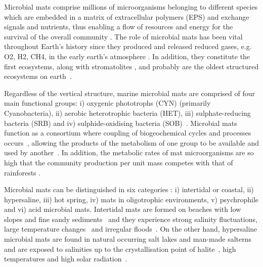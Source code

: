    Microbial mats comprise millions of microorganisms belonging to different species which are embedded in a matrix of 
   extracellular polymers (EPS) and exchange signals and nutrients, 
   thus enabling a flow of resources and energy for the survival of the overall community 
   \citep{ruvindy_unravelling_2016, prieto-barajas_microbial_2018}. 
   The role of microbial mats has been vital throughout Earth's history since they produced and released reduced gases, 
   e.g. O2, H2, CH4, in the early earth's atmosphere \citep{hoehler_role_2001}. 
   In addition, they constitute the first ecosystems, along with stromatolites 
   \citep{santoyo_unveiling_2021}, 
   and probably are the oldest structured ecosystems on earth~\citep{van_gemerden_microbial_1993}.

   Regardless of the vertical structure, marine microbial mats are comprised of four main functional groups: 
   i) oxygenic phototrophs (CYN) (primarily Cyanobacteria), 
   ii) aerobic heterotrophic bacteria (HET), 
   iii) sulphate-reducing bacteria (SRB) and 
   iv) sulphide-oxidising bacteria (SOB)~\citep{visscher_microbial_2005}. 
   Microbial mats function as a consortium where coupling of biogeochemical cycles and processes occurs~\citep{paerl_cyanobacterialbacterial_2000}, 
   allowing the products of the metabolism of one group to be available and used by another~\citep{santoyo_unveiling_2021}. 
   In addition, the metabolic rates of mat microorganisms are so high that the community production per unit mass competes with that of rainforests
   \citep{jorgensen_diffusion_1994, krumbein_fossil_2003}. 

   Microbial mats can be distinguished in six categories 
   \citep{bolhuis_molecular_2014, prieto-barajas_microbial_2018}: 
   i) intertidal or coastal, 
   ii) hypersaline, 
   iii) hot spring, 
   iv) mats in oligotrophic environments, 
   v) psychrophile and vi) acid microbial mats. 
   Intertidal mats are formed on beaches with low slopes and fine sandy sediments~\citep{stal_cyanobacterial_2012} 
   and they experience strong salinity fluctuations, large temperature changes~\citep{bolhuis_molecular_2014}
   and irregular floods~\citep{prieto-barajas_microbial_2018}. 
   On the other hand, hypersaline microbial mats are found in natural occurring salt lakes and man-made salterns~\citep{bolhuis_molecular_2014} and are exposed to salinities up to 
   the crystallisation point of halite~\citep{jorgensen_diffusion_1994}, 
   high temperatures and high solar radiation~\citep{bolhuis_molecular_2014}. 
   
